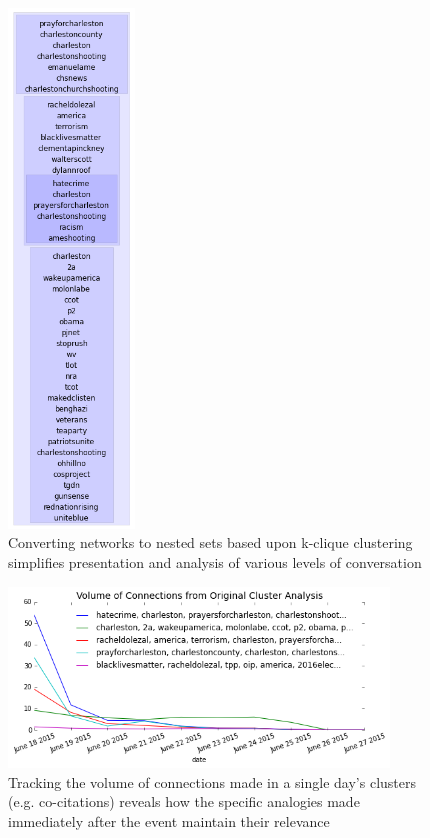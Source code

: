 \documentclass[12pt]{article}
\begin{document}
\begin{figure}[!ht]
  \centering
    \includegraphics[width=0.3\textwidth]{F5_one_column_nested_cluster.png}
    \caption{Converting networks to nested sets based  upon k-clique clustering simplifies presentation and  analysis of various levels of conversation}
  \label{fig:set_cluster}
\end{figure}

\begin{figure}[!ht]
  \centering
    \includegraphics[width=0.9\textwidth]{F6_original_clusters_over_time.png}
    \caption{Tracking the volume of connections made in a single day's clusters (e.g. co-citations) reveals how the specific analogies made immediately after the event maintain their relevance}
  \label{fig:cluster_over_time}
\end{figure}
\end{document}
